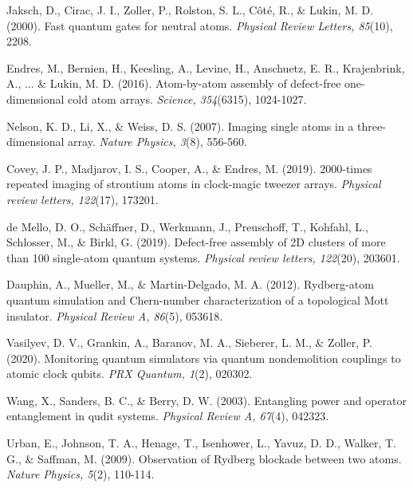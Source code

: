 \documentclass[aps,twocolumn,preprintnumbers]{revtex4}
\begin{document}
\begin{thebibliography}{5}
 Jaksch, D., Cirac, J. I., Zoller, P., Rolston, S. L., Côté, R., \& Lukin, M. D. (2000). Fast quantum gates for neutral atoms. \textit{Physical Review Letters, 85}(10), 2208.

 Endres, M., Bernien, H., Keesling, A., Levine, H., Anschuetz, E. R., Krajenbrink, A., ... \& Lukin, M. D. (2016). Atom-by-atom assembly of defect-free one-dimensional cold atom arrays. \textit{Science, 354}(6315), 1024-1027.

 Nelson, K. D., Li, X., \& Weiss, D. S. (2007). Imaging single atoms in a three-dimensional array. \textit{Nature Physics, 3}(8), 556-560.

 Covey, J. P., Madjarov, I. S., Cooper, A., \& Endres, M. (2019). 2000-times repeated imaging of strontium atoms in clock-magic tweezer arrays. \textit{Physical review letters, 122}(17), 173201.

 de Mello, D. O., Schäffner, D., Werkmann, J., Preuschoff, T., Kohfahl, L., Schlosser, M., \& Birkl, G. (2019). Defect-free assembly of 2D clusters of more than 100 single-atom quantum systems. \textit{Physical review letters, 122}(20), 203601.

 Dauphin, A., Mueller, M., \& Martin-Delgado, M. A. (2012). Rydberg-atom quantum simulation and Chern-number characterization of a topological Mott insulator. \textit{Physical Review A, 86}(5), 053618.

 Vasilyev, D. V., Grankin, A., Baranov, M. A., Sieberer, L. M., \& Zoller, P. (2020). Monitoring quantum simulators via quantum nondemolition couplings to atomic clock qubits. \textit{PRX Quantum, 1}(2), 020302.

 Wang, X., Sanders, B. C., \& Berry, D. W. (2003). Entangling power and operator entanglement in qudit systems. \textit{Physical Review A, 67}(4), 042323.

 Urban, E., Johnson, T. A., Henage, T., Isenhower, L., Yavuz, D. D., Walker, T. G., \& Saffman, M. (2009). Observation of Rydberg blockade between two atoms. \textit{Nature Physics, 5}(2), 110-114.

\end{thebibliography}
\end{document}
